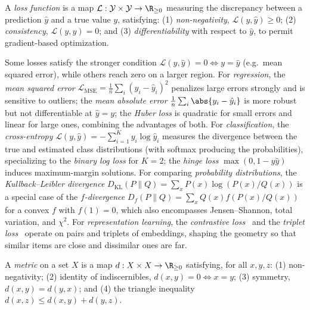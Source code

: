 \begin{definition}
\label{def:found:loss}
A \emph{loss function} is a map $\mathcal{L} : \mathcal{Y} \times \mathcal{Y} \to
\R_{\ge 0}$ measuring the discrepancy between a prediction $\hat{y}$ and a true
value $y$, satisfying: (1) \emph{non-negativity}, $\mathcal{L}(y, \hat{y}) \ge
0$; (2) \emph{consistency}, $\mathcal{L}(y, y) = 0$; and (3)
\emph{differentiability} with respect to $\hat{y}$, to permit gradient-based
optimization.
\end{definition}

Some losses satisfy the stronger condition $\mathcal{L}(y, \hat{y}) = 0
\Leftrightarrow y = \hat{y}$ (e.g.\ mean squared error), while others reach zero
on a larger region. For \emph{regression}, the \emph{mean squared error}
$\mathcal{L}_{\mathrm{MSE}} = \frac{1}{n}\sum_i (y_i - \hat{y}_i)^2$ penalizes
large errors strongly and is sensitive to outliers; the \emph{mean absolute
error} $\frac{1}{n}\sum_i \abs{y_i - \hat{y}_i}$ is more robust but not
differentiable at $\hat{y} = y$; the \emph{Huber loss} is quadratic for small
errors and linear for large ones, combining the advantages of both. For
\emph{classification}, the \emph{cross-entropy}
$\mathcal{L}(y, \hat{y}) = -\sum_{i=1}^K y_i \log \hat{y}_i$ measures the
divergence between the true and estimated class distributions (with softmax
producing the probabilities), specializing to the \emph{binary log loss} for
$K = 2$; the \emph{hinge loss} $\max(0, 1 - y\hat{y})$ induces maximum-margin
solutions. For comparing \emph{probability distributions}, the
\emph{Kullback--Leibler divergence}
$D_{\mathrm{KL}}(P \| Q) = \sum_x P(x) \log(P(x)/Q(x))$ is a special case of the
\emph{$f$-divergence} $D_f(P \| Q) = \sum_x Q(x) f(P(x)/Q(x))$ for a convex $f$
with $f(1) = 0$, which also encompasses Jensen--Shannon, total variation, and
$\chi^2$. For \emph{representation learning}, the \emph{contrastive
loss}~\citep{hadsell2006dimensionality} and the \emph{triplet
loss}~\citep{schroff2015facenet} operate on pairs and triplets of embeddings,
shaping the geometry so that similar items are close and dissimilar ones are
far.

\begin{definition}[Metric]
\label{def:found:metric}
A \emph{metric} on a set $X$ is a map $d : X \times X \to \R_{\ge 0}$ satisfying,
for all $x, y, z$: (1) non-negativity; (2) identity of indiscernibles,
$d(x,y) = 0 \Leftrightarrow x = y$; (3) symmetry, $d(x,y) = d(y,x)$; and (4) the
triangle inequality $d(x,z) \le d(x,y) + d(y,z)$.
\end{definition}

